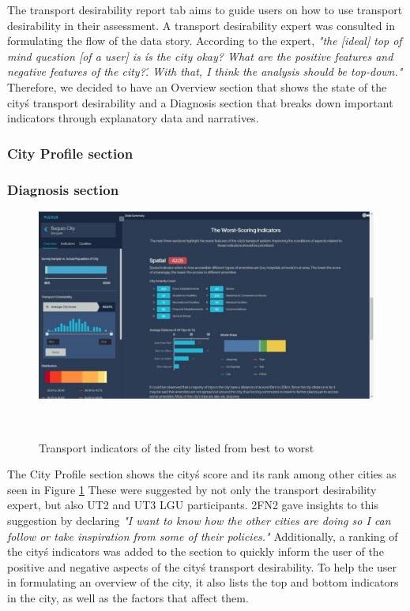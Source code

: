 \documentclass{sigchi}
\begin{document}
The transport desirability report tab aims to guide users on how to use transport desirability in their assessment. A transport desirability expert was consulted in formulating the flow of the data story. According to the expert, \textit{"the [ideal] top of mind question [of a user] is \'is the city okay? What are the positive features and negative features of the city?\'. With that, I think the analysis should be top-down."} Therefore, we decided to have an Overview section that shows the state of the city\'s transport desirability and a Diagnosis section that breaks down important indicators through explanatory data and narratives.

\subsubsection{City Profile section}
\subsubsection{Diagnosis section}
\begin{figure}
\centering
  \includegraphics[width=0.9\columnwidth]{figures/latest-screens/city-1.jpg}
  \caption{Transport indicators of the city listed from best to worst}~\label{fig:CityProf}
\end{figure}

The City Profile section shows the city\'s score and its rank among other cities as seen in Figure \ref{fig:CityProf} These were suggested by not only the transport desirability expert, but also UT2 and UT3 LGU participants. 2FN2 gave insights to this suggestion by declaring \textit{"I want to know how the other cities are doing so I can follow or take inspiration from some of their policies."} Additionally, a ranking of the city\'s indicators was added to the section to quickly inform the user of the positive and negative aspects of the city\'s transport desirability. To help the user in formulating an overview of the city, it also lists the top and bottom indicators in the city, as well as the factors that affect them.
\end{document}
